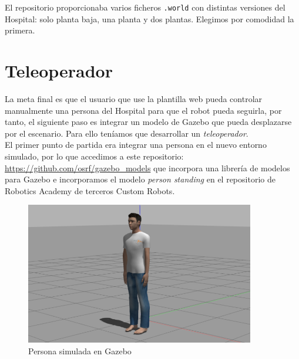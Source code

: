 El repositorio proporcionaba varios ficheros \texttt{.world} con distintas versiones del Hospital: solo planta baja, una planta y dos plantas. Elegimos por comodidad la primera.\\



\section{Teleoperador}
\label{sec:teleoperador}

La meta final es que el usuario que use la plantilla web pueda controlar manualmente una persona del Hospital para que el robot pueda seguirla, por tanto, el siguiente paso es integrar un modelo de Gazebo que pueda desplazarse por el escenario. Para ello teníamos que desarrollar un \textit{teleoperador}.\\

El primer punto de partida era integrar una persona en el nuevo entorno simulado, por lo que accedimos a este repositorio: \url{https://github.com/osrf/gazebo_models} que incorpora una librería de modelos para Gazebo e incorporamos el modelo \textit{person standing} en el repositorio de Robotics Academy de terceros Custom Robots.\\

\begin{figure} [H]
  \begin{center}
    \includegraphics[width=10cm]{imagenes/cap5/person_model.png}
  \end{center}
  \caption[Persona simulada en Gazebo]{Persona simulada en Gazebo}
  \label{fig:persona_gazebo}
\end{figure}\

